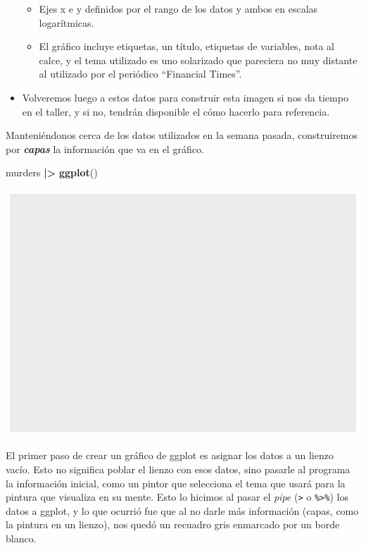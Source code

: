 \documentclass[
]{article}
\newenvironment{Shaded}{\begin{snugshade}}{\end{snugshade}}
\newcommand{\FunctionTok}[1]{\textcolor[rgb]{0.13,0.29,0.53}{\textbf{#1}}}
\newcommand{\NormalTok}[1]{#1}
\newcommand{\SpecialCharTok}[1]{\textcolor[rgb]{0.81,0.36,0.00}{\textbf{#1}}}
\providecommand{\tightlist}{%
  \setlength{\itemsep}{0pt}\setlength{\parskip}{0pt}}
\begin{document}
\begin{itemize}
  \begin{itemize}
  \tightlist
  \item
    Ejes x e y definidos por el rango de los datos y ambos en escalas
    logarítmicas.\\
  \item
    El gráfico incluye etiquetas, un título, etiquetas de variables,
    nota al calce, y el tema utilizado es uno solarizado que pareciera
    no muy distante al utilizado por el periódico ``Financial Times''.
  \end{itemize}
\item
  Volveremos luego a estos datos para construir esta imagen si nos da
  tiempo en el taller, y si no, tendrán disponible el cómo hacerlo para
  referencia.
\end{itemize}

Manteniéndonos cerca de los datos utilizados en la semana pasada,
construiremos por \textbf{\emph{capas}} la información que va en el
gráfico.

\begin{Shaded}
\begin{Highlighting}[]
\NormalTok{murders }\SpecialCharTok{|\textgreater{}} \FunctionTok{ggplot}\NormalTok{()}
\end{Highlighting}
\end{Shaded}

\includegraphics{Taller-2_files/figure-latex/Un lienzo en blanco-1.pdf}

El primer paso de crear un gráfico de ggplot es asignar los datos a un
lienzo vacío. Esto no significa poblar el lienzo con esos datos, sino
pasarle al programa la información inicial, como un pintor que
selecciona el tema que usará para la pintura que visualiza en su mente.
Esto lo hicimos al pasar el \emph{pipe}
(\texttt{\textbar{}\textgreater{}} o \texttt{\%\textgreater{}\%}) los
datos a ggplot, y lo que ocurrió fue que al no darle más información
(capas, como la pintura en un lienzo), nos quedó un recuadro gris
enmarcado por un borde blanco.
\end{document}
